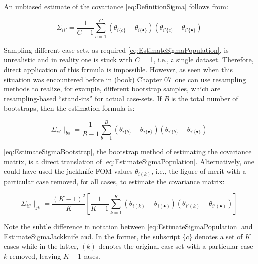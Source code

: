 \documentclass[
]{book}
\begin{document}
An unbiased estimate of the covariance \eqref{eq:DefinitionSigma} follows from:

\begin{equation}
\Sigma_{ii'}=\frac{1}{C-1}\sum_{c=1}^{C} \left ( \theta_{i\{c\}} - \theta_{i\{\bullet\}} \right) \left ( \theta_{i'\{c\}} - \theta_{i'\{\bullet\}} \right)
\label{eq:EstimateSigmaPopulation}
\end{equation}

Sampling different case-sets, as required \eqref{eq:EstimateSigmaPopulation}, is unrealistic and in reality one is stuck with \(C\) = 1, i.e., a single dataset. Therefore, direct application of this formula is impossible. However, as seen when this situation was encountered before in (book) Chapter 07, one can use resampling methods to realize, for example, different bootstrap samples, which are resampling-based ``stand-ins'' for actual case-sets. If \(B\) is the total number of bootstraps, then the estimation formula is:

\begin{equation}
\Sigma_{ii'}\mid_{bs} =\frac{1}{B-1}\sum_{b=1}^{B} \left ( \theta_{i\{b\}} - \theta_{i\{\bullet\}} \right) \left ( \theta_{i'\{b\}} - \theta_{i'\{\bullet\}} \right)
\label{eq:EstimateSigmaBootstrap}
\end{equation}

\eqref{eq:EstimateSigmaBootstrap}, the bootstrap method of estimating the covariance matrix, is a direct translation of \eqref{eq:EstimateSigmaPopulation}. Alternatively, one could have used the jackknife FOM values \(\theta_{i(k)}\), i.e., the figure of merit with a particular case removed, for all cases, to estimate the covariance matrix:

\begin{equation}
\Sigma_{ii'}\mid_{jk} =\frac{(K-1)^2}{K} \left [ \frac{1}{K-1}\sum_{k=1}^{K} \left ( \theta_{i(k)} - \theta_{i(\bullet)} \right) \left ( \theta_{i'(k)} - \theta_{i'(\bullet)} \right) \right ]
\label{eq:EstimateSigmaJackknife}
\end{equation}

Note the subtle difference in notation between \eqref{eq:EstimateSigmaPopulation} and EstimateSigmaJackknife and. In the former, the subscript \(\{c\}\) denotes a set of \(K\) cases while in the latter, \((k)\) denotes the original case set with a particular case \(k\) removed, leaving \(K-1\) cases.
\end{document}
